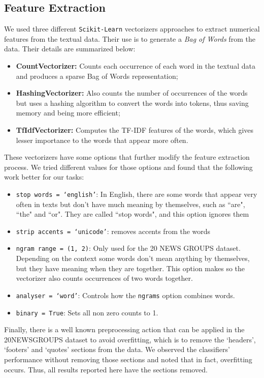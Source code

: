 \documentclass[conference]{IEEEtran}
\begin{document}
\subsection{Feature Extraction}

We used three different \texttt{Scikit-Learn} vectorizers approaches to extract numerical features from the textual data. Their use is to generate a \textit{Bag of Words} from the data. Their details are summarized below:

\begin{itemize}
    \item \textbf{CountVectorizer:} Counts each occurrence of each word in the textual data and produces a sparse Bag of Words representation;
    \item \textbf{HashingVectorizer:} Also counts the number of occurrences of the words but uses a hashing algorithm to convert the words into tokens, thus saving memory and being more efficient;
    \item \textbf{TfIdfVectorizer:} Computes the TF-IDF features of the words, which gives lesser importance to the words that appear more often. 
\end{itemize}

These vectorizers have some options that further modify the feature extraction process. We tried different values for those options and found that the following work better for our tasks:

\begin{itemize}
    \item \texttt{stop words = `english'}: In English, there are some words that appear very often in texts but don't have much meaning by themselves, such as ``are", ``the" and ``or". They are called ``stop words", and this option ignores them
    \item \texttt{strip accents = `unicode'}: removes accents from the words
    \item \texttt{ngram range = (1, 2)}: Only used for the 20 NEWS GROUPS dataset. Depending on the context some words don't mean anything by themselves, but they have meaning when they are together. This option makes so the vectorizer also counts occurrences of two words together.
    \item \texttt{analyser = `word'}: Controls how the \texttt{ngrams} option combines words.
    \item \texttt{binary = True}: Sets all non zero counts to 1.
\end{itemize}

Finally, there is a well known preprocessing action that can be applied in the 20NEWSGROUPS dataset to avoid overfitting, which is to remove the `headers', `footers' and `quotes' sections from the data. We observed the classifiers' performance without removing those sections and noted that in fact, overfitting occurs. Thus, all results reported here have the sections removed.
\end{document}
